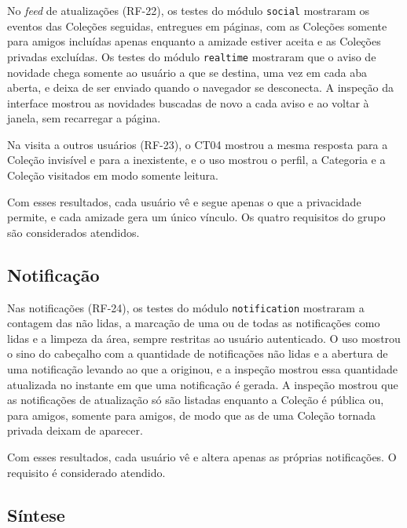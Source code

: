 No \textit{feed} de atualizações (RF-22), os testes do módulo \texttt{social} mostraram os eventos das Coleções seguidas, entregues em páginas, com as
Coleções somente para amigos incluídas apenas enquanto a amizade estiver aceita e as Coleções privadas excluídas. Os testes do módulo \texttt{realtime}
mostraram que o aviso de novidade chega somente ao usuário a que se destina, uma vez em cada aba aberta, e deixa de ser enviado quando o navegador se
desconecta. A inspeção da interface mostrou as novidades buscadas de novo a cada aviso e ao voltar à janela, sem recarregar a página.

Na visita a outros usuários (RF-23), o CT04 mostrou a mesma resposta para a Coleção invisível e para a inexistente, e o uso mostrou o perfil, a Categoria
e a Coleção visitados em modo somente leitura.

Com esses resultados, cada usuário vê e segue apenas o que a privacidade permite, e cada amizade gera um único vínculo. Os quatro requisitos do grupo
são considerados atendidos.

\subsection{Notificação}

Nas notificações (RF-24), os testes do módulo \texttt{notification} mostraram a contagem das não lidas, a marcação de uma ou de todas as notificações como
lidas e a limpeza da área, sempre restritas ao usuário autenticado. O uso mostrou o sino do cabeçalho com a quantidade de notificações não lidas e a abertura de uma
notificação levando ao que a originou, e a inspeção mostrou essa quantidade atualizada no instante em que uma notificação é gerada. A inspeção mostrou que as notificações de atualização só são listadas enquanto a
Coleção é pública ou, para amigos, somente para amigos, de modo que as de uma Coleção tornada privada deixam de aparecer.

Com esses resultados, cada usuário vê e altera apenas as próprias notificações. O requisito é considerado atendido.

\subsection{Síntese}

